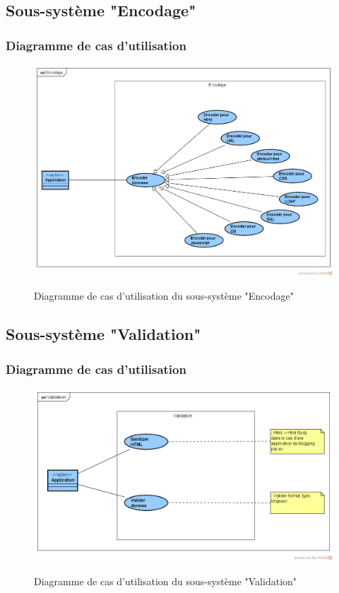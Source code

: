 \subsection{Sous-système "Encodage"}
\subsubsection{Diagramme de cas d'utilisation}
\begin{figure}[H]
	\centering
	\begin{minipage}{12cm}
		\centering
		{\includegraphics[height=0.35\textheight, width=1\textwidth]{fig/Encodage-use-case-diagram.png}}
	\end{minipage}
	\caption{Diagramme de cas d'utilisation du sous-système "Encodage"}
	\label{fig:7.15}
\end{figure}

\subsection{Sous-système "Validation"}
\subsubsection{Diagramme de cas d'utilisation}
\begin{figure}[H]
	\centering
	\begin{minipage}{12cm}
		\centering
		{\includegraphics[height=0.35\textheight, width=1\textwidth]{fig/Validation-use-case-diagram.png}}
	\end{minipage}
	\caption{Diagramme de cas d'utilisation du sous-système "Validation"}
	\label{fig:7.16}
\end{figure}
